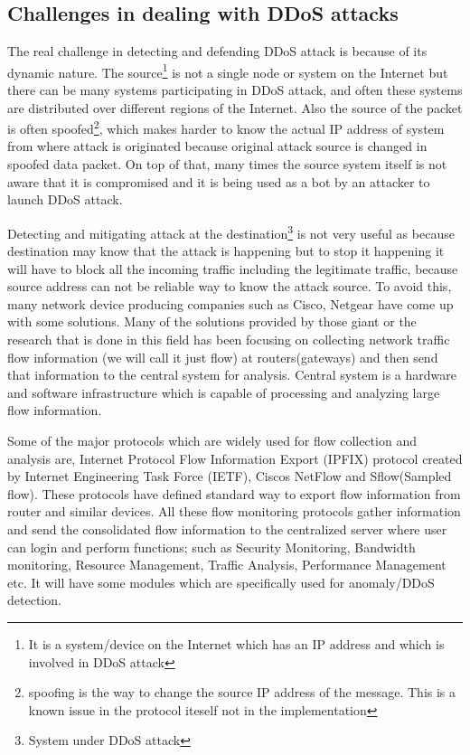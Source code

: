 \documentclass[10pt,oneside,a4paper]{article}
\begin{document}
\subsection{Challenges in dealing with DDoS attacks}
The real challenge in detecting and defending DDoS attack is because of its dynamic nature. The source\footnote{It is a system/device on the Internet which has an IP address and which is involved in DDoS attack} is not a single node or system on the Internet but there can be many systems participating in DDoS attack, and often these systems are distributed over different regions of the Internet. Also the source of the packet is often spoofed\footnote{spoofing is the way to change the source IP address of the message. This is a known issue in the protocol iteself not in the implementation}\cite{ip-spoofing}, which makes harder to know the actual IP address of system from where attack is originated because original attack source is changed in spoofed data packet. On top of that, many times the source system itself is not aware that it is compromised and it is being used as a bot\cite{bot} by an attacker to launch DDoS attack.

Detecting and mitigating attack at the destination\footnote{System under DDoS attack} is not very useful as because destination may know that the attack is happening but to stop it happening it will have to block all the incoming traffic including the legitimate traffic, because source address can not be reliable way to know the attack source. To avoid this, many network device producing companies such as Cisco, Netgear have come up with some solutions. Many of the solutions provided by those giant or the research that is done in this field has been focusing on collecting network traffic flow information\cite{network-traffic-flow} (we will call it just flow) at routers(gateways) and then send that information to the central system for analysis. Central system is a hardware and software infrastructure which is capable of processing and analyzing large flow information.\par

Some of the major protocols which are widely used for flow collection and analysis are, Internet Protocol Flow Information Export (IPFIX) protocol created by Internet Engineering Task Force (IETF), Ciscos NetFlow\cite{cisco-netflow} and Sflow(Sampled flow)\cite{sflow}. These protocols have defined standard way to export flow information from router and similar devices. All these flow monitoring protocols gather information and send the consolidated flow information to the centralized server where user can login and perform functions; such as Security Monitoring, Bandwidth monitoring, Resource Management, Traffic Analysis, Performance Management etc. It will have some modules which are specifically used for anomaly/DDoS detection.\par
\end{document}
